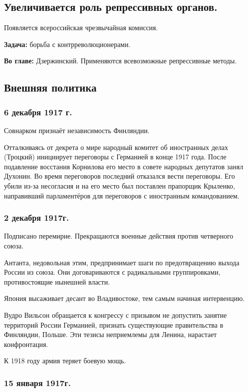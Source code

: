\subsection{Увеличивается роль репрессивных органов.}

Появляется всероссийская чрезвычайная комиссия.

\textbf{Задача:} борьба с контрреволюционерами.

\textbf{Во главе:} Дзержинский.
Применяются всевозможные репрессивные методы.

\subsection{Внешняя политика}

\subsubsection{\textbf{6 декабря 1917 г.}}

Совнарком признаёт независимость Финляндии.

Отталкиваясь от декрета о мире народный комитет об иностранных делах (Троцкий) инициирует переговоры с Германией в конце 1917 года. После подавление восстания Корнилова его место в совете народных депутатов занял Духонин. Во время переговоров последний отказался вести переговоры. Его убили из-за несогласия и на его место был поставлен прапорщик Крыленко, направивший парламентёров для переговоров с иностранным командованием.

\subsubsection{\textbf{2 декабря 1917г.}}

Подписано перемирие. Прекращаются военные действия против четверного союза.

Антанта, недовольная этим, предпринимает шаги по предотвращению выхода России из союза. Они договариваются с радикальными группировками, противостоящие нынешней власти.

Япония высаживает десант во Владивостоке, тем самым начиная интервенцию.

Вудро Вильсон обращается к конгрессу с призывом не допустить занятие территорий России Германией, признать существующие правительства в Финляндии, Польше. Эти тезисы неприемлемы для Ленина, нарастает конфронтация.

К 1918 году армия теряет боевую мощь.

\subsubsection{\textbf{15 января 1917г.}}

